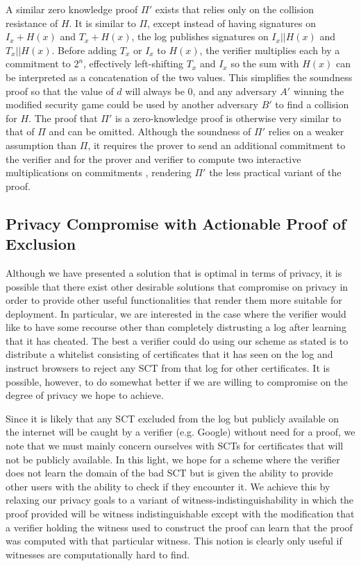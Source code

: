 \documentclass[letterpaper,twocolumn,10pt]{article}
\begin{document}
A similar zero knowledge proof $\Pi'$ exists that relies only on the collision resistance of $H$. It is similar to $\Pi$, except instead of having signatures on $I_x+H(x)$ and $T_x+H(x)$, the log publishes signatures on $I_x||H(x)$ and $T_x||H(x)$. Before adding $T_x$ or $I_x$ to $H(x)$, the verifier multiplies each by a commitment to $2^n$, effectively left-shifting $T_x$ and $I_x$ so the sum with $H(x)$ can be interpreted as a concatenation of the two values. This simplifies the soundness proof so that the value of $d$ will always be 0, and any adversary $A'$ winning the modified security game could be used by another adversary $B'$ to find a collision for $H$. The proof that $\Pi'$ is a zero-knowledge proof is otherwise very similar to that of $\Pi$ and can be omitted. Although the soundness of $\Pi'$ relies on a weaker assumption than $\Pi$, it requires the prover to send an additional commitment to the verifier and for the prover and verifier to compute two interactive multiplications on commitments \cite{CM01}, rendering $\Pi'$ the less practical variant of the proof.

\subsection{Privacy Compromise with Actionable Proof of Exclusion}

Although we have presented a solution that is optimal in terms of privacy, it is possible that there exist other desirable solutions that compromise on privacy in order to provide other useful functionalities that render them more suitable for deployment. In particular, we are interested in the case where the verifier would like to have some recourse other than completely distrusting a log after learning that it has cheated. The best a verifier could do using our scheme as stated is to distribute a whitelist consisting of certificates that it has seen on the log and instruct browsers to reject any SCT from that log for other certificates. It is possible, however, to do somewhat better if we are willing to compromise on the degree of privacy we hope to achieve.

Since it is likely that any SCT excluded from the log but publicly available on the internet will be caught by a verifier (e.g. Google) without need for a proof, we note that we must mainly concern ourselves with SCTs for certificates that will not be publicly available. In this light, we hope for a scheme where the verifier does not learn the domain of the bad SCT but is given the ability to provide other users with the ability to check if they encounter it. We achieve this by relaxing our privacy goals to a variant of witness-indistinguishability in which the proof provided will be witness indistinguishable except with the modification that a verifier holding the witness used to construct the proof can learn that the proof was computed with that particular witness. This notion is clearly only useful if witnesses are computationally hard to find.
\end{document}
